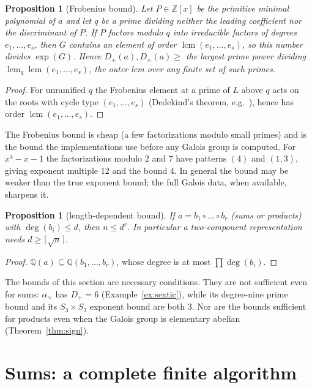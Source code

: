 \documentclass[11pt,a4paper]{article}
\newtheorem{proposition}[theorem]{Proposition}
\theoremstyle{definition}
\theoremstyle{remark}
\newcommand{\Q}{\mathbb{Q}}
\newcommand{\Z}{\mathbb{Z}}
\newcommand{\lcm}{\operatorname{lcm}}
\newcommand{\dg}{\deg}
\newcommand{\Dp}{D_{+}}
\newcommand{\Dt}{D_{\times}}
\begin{document}
\begin{proposition}[Frobenius bound]\label{prop:frobenius}
Let $P\in\Z[x]$ be the primitive minimal polynomial of $a$ and let $q$ be a prime dividing neither the
leading coefficient nor the discriminant of $P$.  If $P$ factors modulo $q$ into irreducible factors of
degrees $e_1,\dots,e_s$, then $G$ contains an element of order $\lcm(e_1,\dots,e_s)$, so this number
divides $\exp(G)$.  Hence $\Dp(a),\Dt(a)\ge$ the largest prime power dividing
$\lcm_q\lcm(e_1,\dots,e_s)$, the outer lcm over any finite set of such primes.
\end{proposition}

\begin{proof}
For unramified $q$ the Frobenius element at a prime of $L$ above $q$ acts on the roots with cycle type
$(e_1,\dots,e_s)$ (Dedekind's theorem, e.g.\ \cite[Th.~4.37]{Cohen}), hence has order
$\lcm(e_1,\dots,e_s)$.
\end{proof}

The Frobenius bound is cheap (a few factorizations modulo small primes) and is the bound the
implementations use before any Galois group is computed.  For $x^4-x-1$ the factorizations modulo $2$
and $7$ have patterns $(4)$ and $(1,3)$, giving exponent multiple $12$ and the bound $4$.  In general
the bound may be weaker than the true exponent bound; the full Galois data, when available, sharpens
it.

\begin{proposition}[length-dependent bound]\label{prop:length}
If $a=b_1\circ\dots\circ b_r$ (sums or products) with $\dg(b_i)\le d$, then $n\le d^r$.  In particular a
two-component representation needs $d\ge\lceil\sqrt n\rceil$.
\end{proposition}

\begin{proof}
$\Q(a)\subseteq\Q(b_1,\dots,b_r)$, whose degree is at most $\prod\dg(b_i)$.
\end{proof}

The bounds of this section are necessary conditions.  They are not sufficient even for sums:
$\alpha_\times$ has $\Dp=6$ (Example~\ref{ex:sextic}), while its degree-nine prime bound and its
$S_3\times S_3$ exponent bound are both $3$.  Nor are the bounds sufficient for products even when the
Galois group is elementary abelian (Theorem~\ref{thm:sign}).

\section{Sums: a complete finite algorithm}\label{sec:sums}
\end{document}
